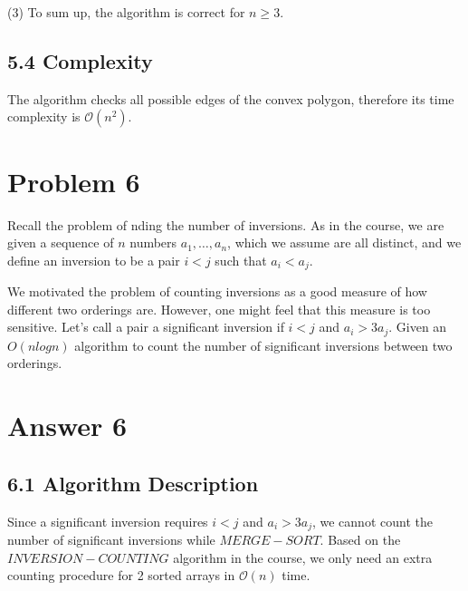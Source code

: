 \documentclass[UTF8]{ctexart}
\begin{document}
(3) To sum up, the algorithm is correct for $n \geq 3$.
\subsection*{5.4 Complexity}
The algorithm checks all possible edges of the convex polygon, therefore its time complexity is $\mathcal{O}(n^2)$. 

\section*{Problem 6}
Recall the problem of nding the number of inversions. As in the course, we are given a
sequence of $n$ numbers $a_1, \ldots , a_n$, which we assume are all distinct, and we define an inversion
to be a pair $i < j$ such that $a_i < a_j$.

We motivated the problem of counting inversions as a good measure of how different two
orderings are. However, one might feel that this measure is too sensitive. Let's call a pair a
significant inversion if $i < j$ and $a_i > 3a_j$. Given an $O(n log n)$ algorithm to count the number
of significant inversions between two orderings.

\section*{Answer 6}
\subsection*{6.1 Algorithm Description}
Since a significant inversion requires $i < j$ and $a_i > 3a_j$, we cannot count the number of significant inversions 
while $MERGE-SORT$. Based on the $INVERSION-COUNTING$ algorithm in the course, we only need an extra counting procedure 
for 2 sorted arrays in $\mathcal{O}(n)$ time.\\
\end{document}
